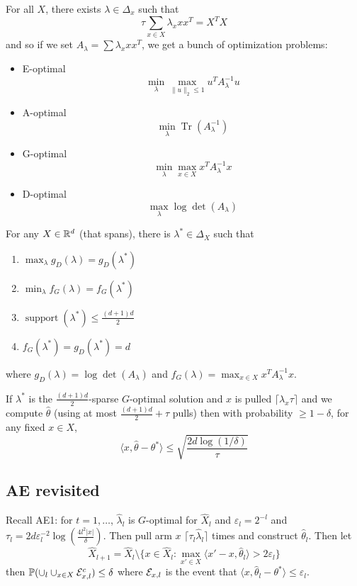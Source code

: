 \documentclass[12pt]{article}
\begin{document}
\brk

For all $X$, there exists $\lambda\in\Delta_x$ such that 
\[\tau\sum_{x\in X}\lambda_x xx^T=X^TX\]
and so if we set $A_\lambda=\sum \lambda_xxx^T$, we get a bunch of optimization problems:
\begin{itemize}
	\item E-optimal
	\[\min_\lambda\max_{\|u\|_2\le 1}u^TA^{-1}_\lambda u\]
	\item A-optimal
	\[\min_\lambda\operatorname{Tr}(A_\lambda^{-1})\]
	\item G-optimal
	\[\min_\lambda\max_{x\in X}x^TA^{-1}_\lambda x\]
	\item D-optimal
	\[\max_{\lambda}\log\det(A_\lambda)\]
\end{itemize}
\begin{thm}
	For any $X\in\mathbb{R}^d$ (that spans), there is $\lambda^\ast\in\Delta_X$ such that 
	\begin{enumerate}
		\item $\max_\lambda g_D(\lambda)=g_D(\lambda^\ast)$
		\item $\min_\lambda f_G(\lambda)=f_G(\lambda^\ast)$
		\item $\operatorname{support}(\lambda^\ast)\le\frac{(d+1)d}{2}$
		\item $f_G(\lambda^\ast)=g_D(\lambda^\ast)=d$
	\end{enumerate}
	where $g_D(\lambda)=\log\det(A_\lambda)$ and $f_G(\lambda)=\max_{x\in X}x^TA_\lambda^{-1}x.$
\end{thm}

\begin{prop}
	If $\lambda^\ast$ is the $\frac{(d+1)d}2$-sparse $G$-optimal solution and $x$ is pulled $\lceil\lambda_x\tau\rceil$ and we compute $\hat\theta$ (using at most $\frac{(d+1)d}{2}+\tau$ pulls)
	then with probability $\ge 1-\delta$, for any fixed $x\in X$,
	\[\langle x,\hat\theta-\theta^\ast\rangle\le\sqrt{\frac{2d\log(1/\delta)}{\tau}}\]
\end{prop}

\subsection{AE revisited}
Recall AE1: for $t=1,\dots$, $\hat\lambda_l$ is $G$-optimal for $\hat X_l$ and $\varepsilon_l=2^{-l}$ and $\tau_l=2d\varepsilon_l^{-2}\log\left(\frac{4l^2|x|}{\delta}\right).$
Then pull arm $x$ $\lceil\tau_l\hat\lambda_l\rceil$ times and construct $\hat\theta_l$. Then let 
\[\hat X_{l+1}=\hat X_l\setminus\{x\in\hat X_l:\max_{x'\in X}\langle x'-x,\hat\theta_l\rangle>2\varepsilon_l\}\]
then $\mathbb{P}(\cup_l\cup_{x\in X}\mathcal{E}_{x,l}^c)\le\delta$ where $\mathcal{E}_{x,l}$ is the event that $\langle x,\hat\theta_l-\theta^\ast\rangle\le\varepsilon_l.$
\end{document}
